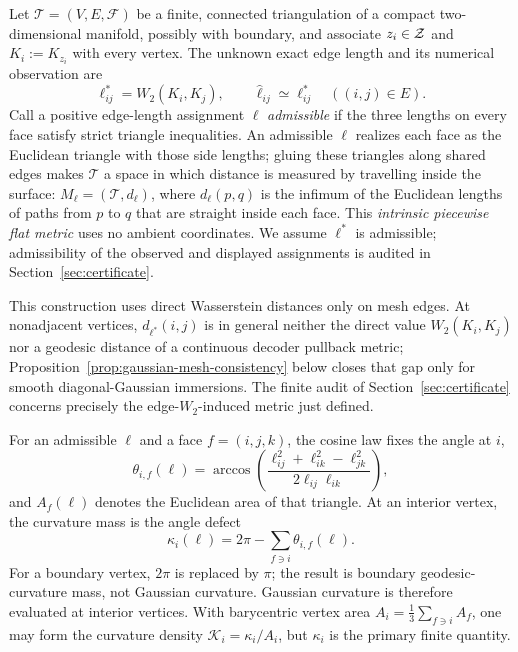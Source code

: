 Let $\mathcal T=(V,E,\mathcal F)$ be a finite, connected triangulation of a
compact two-dimensional manifold, possibly with boundary, and associate
$z_i\in\mathcal{Z}$ and $K_i:=K_{z_i}$ with every vertex.  The unknown exact edge
length and its numerical observation are
\begin{equation}
 \ell_{ij}^{*}=W_2(K_i,K_j),
 \qquad \widehat\ell_{ij}\simeq\ell_{ij}^{*}
 \quad ((i,j)\in E).
 \label{eq:true-observed-lengths}
\end{equation}
Call a positive edge-length assignment $\ell$ \emph{admissible} if the three
lengths on every face satisfy strict triangle inequalities.  An admissible
$\ell$ realizes each face as the Euclidean triangle with those side lengths;
gluing these triangles along shared edges makes $\mathcal T$ a space in which
distance is measured by travelling inside the surface:
$M_\ell=(\mathcal T,d_\ell)$, where $d_\ell(p,q)$ is the infimum of the
Euclidean lengths of paths from $p$ to $q$ that are straight inside each face.
This \emph{intrinsic piecewise flat metric} uses no ambient coordinates.  We
assume $\ell^*$ is admissible; admissibility of the observed and displayed
assignments is audited in Section~\ref{sec:certificate}.

This construction uses direct Wasserstein distances only on mesh edges.  At
nonadjacent vertices, $d_{\ell^*}(i,j)$ is in general neither the direct value
$W_2(K_i,K_j)$ nor a geodesic distance of a continuous decoder pullback
metric; Proposition~\ref{prop:gaussian-mesh-consistency} below closes that gap
only for smooth diagonal-Gaussian immersions.  The finite audit of
Section~\ref{sec:certificate} concerns precisely the edge-$W_2$-induced metric
just defined.

For an admissible $\ell$ and a face $f=(i,j,k)$, the cosine law fixes the
angle at $i$,
\begin{equation}
 \theta_{i,f}(\ell)
 =\arccos\!\left(
 \frac{\ell_{ij}^2+\ell_{ik}^2-\ell_{jk}^2}
 {2\ell_{ij}\ell_{ik}}
 \right),
 \label{eq:finite-angle}
\end{equation}
and $A_f(\ell)$ denotes the Euclidean area of that triangle.  At an interior
vertex, the curvature mass is the angle defect
\begin{equation}
 \kappa_i(\ell)=2\pi-\sum_{f\ni i}\theta_{i,f}(\ell).
 \label{eq:finite-curvature}
\end{equation}
For a boundary vertex, $2\pi$ is replaced by $\pi$; the result is boundary
geodesic-curvature mass, not Gaussian curvature.  Gaussian curvature is
therefore evaluated at interior vertices.  With barycentric vertex area
$A_i=\frac13\sum_{f\ni i}A_f$, one may form the curvature density
$\mathcal K_i=\kappa_i/A_i$, but $\kappa_i$ is the primary finite quantity.

